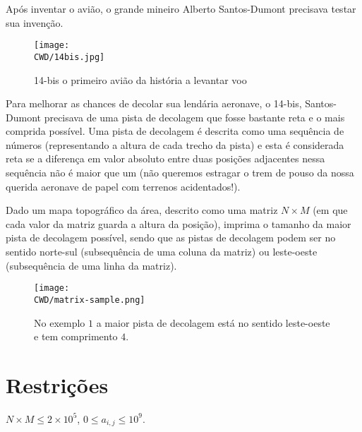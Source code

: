 %

Após inventar o avião, o grande mineiro Alberto Santos-Dumont precisava testar sua invenção.

\begin{figure}[H]
  \centering
  \texttt{[image: \\CWD/14bis.jpg]}
  \caption{14-bis o primeiro avião da história a levantar voo}
\end{figure}

Para melhorar as chances de decolar sua lendária aeronave, o 14-bis, Santos-Dumont precisava de uma pista de decolagem que fosse bastante reta e o mais comprida possível. Uma pista de decolagem é descrita como uma sequência de números (representando a altura de cada trecho da pista) e esta é considerada reta se a diferença em valor absoluto entre duas posições adjacentes nessa sequência não é maior que um (não queremos estragar o trem de pouso da nossa querida aeronave de papel com terrenos acidentados!).

Dado um mapa topográfico da área, descrito como uma matriz $N\times M$ (em que cada valor da matriz guarda a altura da posição), imprima o tamanho da maior pista de decolagem possível, sendo que as pistas de decolagem podem ser no sentido norte-sul (subsequência de uma coluna da matriz) ou leste-oeste (subsequência de uma linha da matriz).

\begin{figure}[H]
  \centering
  \texttt{[image: \\CWD/matrix-sample.png]}
  \caption{No exemplo $1$ a maior pista de decolagem está no sentido leste-oeste e tem comprimento $4$.}
\end{figure}
%
%

%
%


\section*{Restrições}

\begin{itemize}
  $N \times M \leq 2\times 10^5$, $0 \leq a_{i, j} \leq 10^9$.
\end{itemize}


\sampleio
